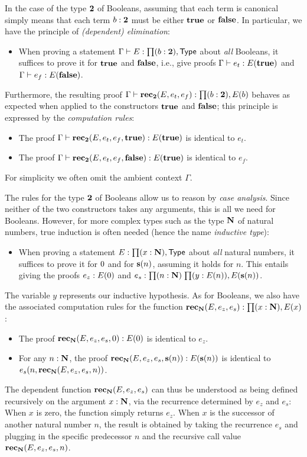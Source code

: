In the case of the type $\mathbf{2}$ of Booleans, assuming that each term is canonical simply means that each term $b : \mathbf{2}$ must be either $\mathbf{true}$ or $\mathbf{false}$. In particular, we have the principle of \emph{(dependent) elimination}:

\begin{itemize}
\item When proving a statement $\Gamma \der E : \prd{b : \two} \type$ about \emph{all} Booleans, it suffices to prove it for $\mathbf{true}$ and $\mathbf{false}$, i.e., give proofs
$\Gamma \vdash e_t : E(\mathbf{true})$ and $\Gamma \vdash e_f : E(\mathbf{false})$.
\end{itemize}

Furthermore, the resulting proof $\Gamma \der \rec_\two(E,e_t,e_f): \prd{b : \two}E(b)$ behaves as expected when applied to the constructors $\mathbf{true}$ and $\mathbf{false}$; this principle is expressed by the \emph{computation rules}:
\begin{itemize}
\item The proof $\Gamma \vdash \mathbf{rec}_\mathbf{2}(E,e_t,e_f,\mathbf{true}) : E(\mathbf{true})$ is identical to $e_t$.
\item The proof $\Gamma \vdash \mathbf{rec}_\mathbf{2}(E,e_t,e_f,\mathbf{false}) : E(\mathbf{true})$ is identical to $e_f$.
\end{itemize}
For simplicity we often omit the ambient context $\Gamma$.

The rules for the type $\mathbf{2}$ of Booleans allow us to reason by \emph{case analysis}. Since neither of the two constructors takes any arguments, this is all we need for Booleans. However, for more complex types such as the type $\mathbf{N}$ of natural numbers, true induction is often needed (hence the name \emph{inductive type}):

\begin{itemize}
\item When proving a statement $E : \prd{x : \nat} \type$ about \emph{all} natural numbers, it suffices to prove it for $0$ and for $\mathbf{s}(n)$, assuming it holds
for $n$. This entails giving the proofs $e_z : E(0)$ and $e_s : \prd{n : \nat}{y : E(n)} E(\s(n))$.
\end{itemize}
The variable $y$ represents our inductive hypothesis. As for Booleans, we also have the associated computation rules for the function $\rec_\nat(E,e_z,e_s) : \prd{x:\nat} E(x)$:
\begin{itemize}
\item The proof $\mathbf{rec}_\mathbf{N}(E,e_z,e_s,0) : E(0)$ is identical to $e_z$.
\item For any $n : \mathbf{N}$, the proof $\mathbf{rec}_\mathbf{N}(E,e_z,e_s,\mathbf{s}(n)) : E(\mathbf{s}(n))$ is identical to $e_s(n,\mathbf{rec}_\mathbf{N}(E,e_z,e_s,n))$.
\end{itemize}
The dependent function $\mathbf{rec}_\mathbf{N}(E,e_z,e_s)$ can thus be understood as being defined recursively on the argument $x : \mathbf{N}$, via the recurrence determined by $e_z$ and $e_s$: When $x$ is zero, the function simply returns $e_z$. When $x$ is the successor of another natural number $n$, the result is obtained by taking the recurrence $e_s$ and plugging in the specific predecessor $n$ and the recursive call value $\mathbf{rec}_\mathbf{N}(E,e_z,e_s,n)$.

